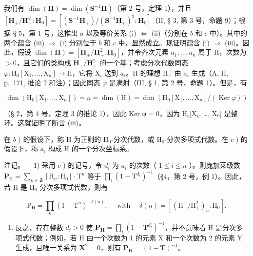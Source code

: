 我们有 \(\dim(\mathbf{H})=\dim(\mathbf{S}^{-1}\mathbf{H})\)（第 2 号，定理 1），并且 \([\mathbf{H}_{+}/\mathbf{H}_{+}^{2}:\mathbf{H}_{0}]=[(\mathbf{S}^{-1}\mathbf{H}_{+})/(\mathbf{S}^{-1}\mathbf{H}_{+})^{2}:\mathbf{H}_{0}]\)（II, § 3, 第 3 号，命题 9）；根据 § 5，第 1 号，这推出 \(a\) 以及等价关系 (i) \(\Leftrightarrow\) (ii)（分别在 \(b\) 和 \(c\) 中）。其中的两个蕴含 (iii) \(\Rightarrow\) (i) 分别位于 \(b\) 和 \(c\) 中，显然成立。现证明蕴含 (i) \(\Rightarrow\) (iii)。因此，假设 \(\dim(\mathbf{H})=[\mathbf{H}_{+}/\mathbf{H}_{+}^{2}:\mathbf{H}_{0}]\)，并令齐次元素 \(a_{1},\ldots,a_{n}\) 属于 H，次数为 \(>0\)，且它们的类构成 \(\mathbf{H}_{+}/\mathbf{H}_{+}^{2}\) 的一个基；考虑分次代数同态 \(\varphi:\mathrm{H}_{0}[\mathrm{X}_{1},\ldots,\mathrm{X}_{n}]\to\mathrm{H}\)，它将 \(\mathrm{X}_{i}\) 送到 \(a_{i}\)。H 的理想 \(\mathrm{H}_{+}\) 由 \(a_{i}\) 生成（A, II, p.~171, 推论 2 和注）；因此同态 \(\varphi\) 是满射（III, § 1, 第 2 号，命题 1）。但是，有

\[
\dim \left(\mathrm{H} _ {0} \left[ \mathrm{X} _ {1}, \dots , \mathrm{X} _ {n} \right]\right) = n = \dim (\mathrm{H}) = \dim \left(\mathrm{H} _ {0} \left[ \mathrm{X} _ {1}, \dots , \mathrm{X} _ {n} \right] / (\operatorname{Ker} \varphi)\right)
\]

（§ 2，第 4 号，定理 3 的推论 1），因此 Ker φ = 0，因为 H₀{[}X₁, \ldots, Xₙ{]} 是整环。这就证明了断言 (iii)。

在 \(b\) ) 的假设下，称 H 为正则的 \(\mathrm{H}_{0}\)-分次代数，或 \(\mathrm{H}_{0}\)-分次多项式代数。在 \(c\) ) 的假设下，称 \(a_{i}\) 构成 H 的一个分次坐标系。

注记。--- 1) 采用 \(c\) ) 的记号，令 \(d_{i}\) 为 \(a_{i}\) 的次数（ \(1 \leqslant i \leqslant n\) ）。则庞加莱级数 \(\mathbf{P}_{\mathrm{H}} = \sum_{n \in \mathbf{Z}} [\mathrm{H}_{n} : \mathrm{H}_{0}] \cdot \mathrm{T}^{n}\) 等于 \(\prod_{i} (1 - \mathrm{T}^{d_{i}})^{-1}\)（§4，第 2 号，例 1）。因此，若 H 是 \(\mathrm{H}_{0}\)-分次多项式代数，则有

\[
\mathrm{P} _ {\mathrm{H}} = \prod_ {n} (1 - \mathrm{T} ^ {n}) ^ {- \delta (n)}, \quad \text { with } \quad \delta (n) = \left[ (\mathrm{H} _ {+} / \mathrm{H} _ {+} ^ {2}) _ {n}: \mathrm{H} _ {0} \right].
\]

\begin{enumerate}
\def\labelenumi{\arabic{enumi})}
\setcounter{enumi}{1}
\tightlist
\item
  反之，存在整数 \(d_{i}>0\) 使 \(\mathbf{P}_{\mathbf{H}}=\prod_{i}(1-\mathbf{T}^{d_{i}})^{-1}\)，并不意味着 H 是分次多项式代数；例如，若 H 由一个次数为 1 的元素 X 和一个次数为 2 的元素 Y 生成，且唯一关系为 \(\mathbf{X}^{2}=0\)，则有 \(\mathbf{P}_{\mathbf{H}}=(1-\mathbf{T})^{-1}\)。
\end{enumerate}

